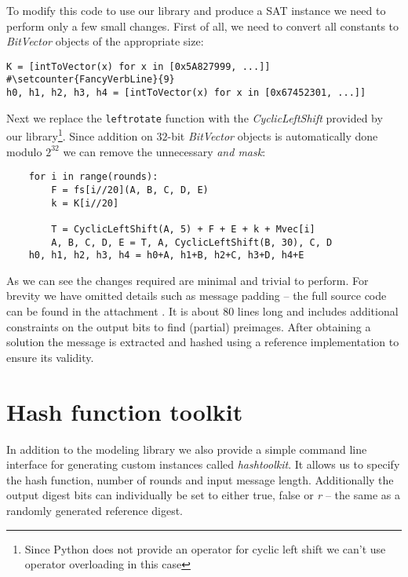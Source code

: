 To modify this code to use our library and produce a SAT instance we need to perform only a few small changes.
First of all, we need to convert all constants to \emph{BitVector} objects of the appropriate size:

\begin{verbatim}
K = [intToVector(x) for x in [0x5A827999, ...]]                                 #\setcounter{FancyVerbLine}{9}
h0, h1, h2, h3, h4 = [intToVector(x) for x in [0x67452301, ...]]
\end{verbatim}

Next we replace the \texttt{leftrotate} function with the \emph{CyclicLeftShift} provided by our library\footnote{Since Python does not provide an operator for cyclic left shift we can't use operator overloading in this case}.
Since addition on $32$-bit \emph{BitVector} objects is automatically done modulo $2^{32}$ we can remove the unnecessary \emph{and mask}:
\begin{verbatim}
    for i in range(rounds):
        F = fs[i//20](A, B, C, D, E)
        k = K[i//20]

        T = CyclicLeftShift(A, 5) + F + E + k + Mvec[i]
        A, B, C, D, E = T, A, CyclicLeftShift(B, 30), C, D
    h0, h1, h2, h3, h4 = h0+A, h1+B, h2+C, h3+D, h4+E
\end{verbatim}

As we can see the changes required are minimal and trivial to perform.
For brevity we have omitted details such as message padding -- the full source code can be found in the attachment \cite{papay2016code}.
It is about 80 lines long and includes additional constraints on the output bits to find (partial) preimages.
After obtaining a solution the message is extracted and hashed using a reference implementation to ensure its validity.


\section{Hash function toolkit}
In addition to the modeling library we also provide a simple command line interface for generating custom instances called \emph{hashtoolkit}.
It allows us to specify the hash function, number of rounds and input message length.
Additionally the output digest bits can individually be set to either true, false or \emph{r} -- the same as a randomly generated reference digest.

